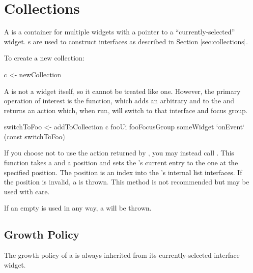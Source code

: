 \section{Collections}

A  is a container for multiple widgets with a pointer
to a ``currently-selected'' widget.  s are used to
construct interfaces as described in Section \ref{sec:collections}.

To create a new collection:

\begin{haskellcode}
 c <- newCollection
\end{haskellcode}

A  is not a widget itself, so it cannot be treated like
one.  However, the primary operation of interest is the
 function, which adds an arbitrary 
and  to the  and returns an 
action which, when run, will switch to that interface and focus group.

\begin{haskellcode}
 switchToFoo <- addToCollection c fooUi fooFocusGroup
 someWidget `onEvent` (const switchToFoo)
\end{haskellcode}

If you choose not to use the  action returned by
, you may instead call .  This
function takes a  and a position and sets the
's current entry to the one at the specified position.
The position is an index into the 's internal list
interfaces.  If the position is invalid, a  is
thrown.  This method is not recommended but may be used with care.


If an empty  is used in any way, a 
will be thrown.

\subsection{Growth Policy}

The growth policy of a  is always inherited from its
currently-selected interface widget.
